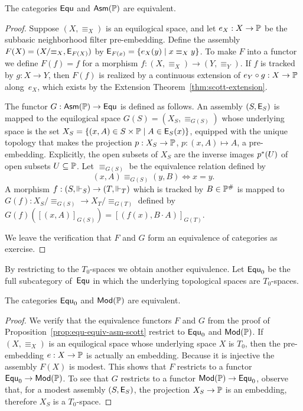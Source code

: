 \begin{proposition}
  \label{prop:equ-equiv-asm-scott}%
  The categories $\mathsf{Equ}$ and $\mathsf{Asm}(\mathbb{P})$ are equivalent.
\end{proposition}

\begin{proof}
  Suppose $(X, {\equiv_X})$ is an equilogical space, and let $e_X : X
  \to \mathbb{P}$ be the subbasic neighborhood filter pre-embedding.
  Define the assembly $F(X) = (X/{\equiv_X}, \mathsf{E}_{F(X)})$ by
  $\mathsf{E}_{F(x)} = \{e_X(y) \mid x \equiv_X y\}$. To make $F$ into a
  functor we define $F(f) = f$ for a morphism $f : (X, {\equiv_X}) \to
  (Y, {\equiv_Y})$. If $f$ is tracked by $g : X \to Y$, then $F(f)$ is
  realized by a continuous extension of $e_Y \circ g : X \to \mathbb{P}$
  along~$e_X$, which exists by the Extension
  Theorem~\ref{thm:scott-extension}.

  The functor $G : \mathsf{Asm}(\mathbb{P}) \to \mathsf{Equ}$ is defined as follows. An
  assembly $(S, \mathsf{E}_S)$ is mapped to the equilogical space $G(S) =
  (X_S, \equiv_{G(S)})$ whose underlying space is the set $X_S =
  \{(x,A) \in S \times \mathbb{P} \mid A \in \mathsf{E}_S(x)\}$, equipped with
  the unique topology that makes the projection $p : X_S \to \mathbb{P}$,
  $p : (x,A) \mapsto A$, a pre-embedding. Explicitly, the open subsets
  of $X_S$ are the inverse images $p^{*}(U)$ of open subsets $U
  \subseteq \mathbb{P}$. Let $\equiv_{G(S)}$ be the equivalence relation
  defined by
  \begin{equation*}
    (x,A) \equiv_{G(S)} (y,B) \iff x = y.
  \end{equation*}
  A morphism $f : (S, {\Vdash_S}) \to (T, {\Vdash_T})$ which is tracked by
  $B \in \mathbb{P}^{\#}$ is mapped to $G(f) : X_S/{\equiv_{G(S)}} \to
  X_T/{\equiv_{G(T)}}$ defined by $G(f)([(x,A)]_{G(S)}) = [(f(x), B
  \cdot A)]_{G(T)}$.

  We leave the verification that $F$ and $G$ form an equivalence of
  categories as exercise.
\end{proof}

By restricting to the $T_0$-spaces we obtain another equivalence. Let
$\mathsf{Equ}_0$ be the full subcategory of~$\mathsf{Equ}$ in which the underlying
topological spaces are $T_0$-spaces.


\begin{proposition}
  \label{prop:equ0-equiv-mod-scott}
  The categories $\mathsf{Equ}_0$ and $\mathsf{Mod}(\mathbb{P})$ are equivalent.
\end{proposition}

\begin{proof}
  We verify that the equivalence functors $F$ and $G$ from the proof
  of Proposition~\ref{prop:equ-equiv-asm-scott} restrict to $\mathsf{Equ}_0$
  and $\mathsf{Mod}(\mathbb{P})$. If $(X, {\equiv_X})$ is an equilogical space
  whose underlying space $X$ is $T_0$, then the pre-embedding $e : X
  \to \mathbb{P}$ is actually an embedding. Because it is injective the
  assembly $F(X)$ is modest. This shows that $F$ restricts to a
  functor $\mathsf{Equ}_0 \to \mathsf{Mod}(\mathbb{P})$.
  To see that $G$ restricts to a functor $\mathsf{Mod}(\mathbb{P}) \to \mathsf{Equ}_0$,
  observe that, for a modest assembly $(S, \mathsf{E}_S)$, the projection
  $X_S \to \mathbb{P}$ is an embedding, therefore $X_S$ is a $T_0$-space.
\end{proof}

